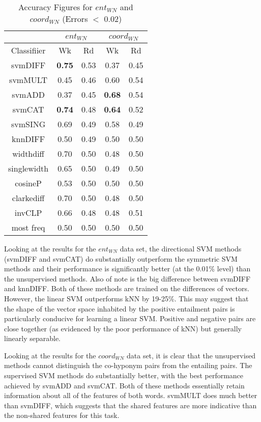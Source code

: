 \documentclass[11pt]{article}
\begin{document}
\begin{table}[ht]
\centering
\begin{tabular}{|c|c|c|c|c|}
\hline
&\multicolumn{2}{|c|}{$ent_{WN}$}&\multicolumn{2}{|c|}{$coord_{WN}$}\\
\hline
Classifiier&Wk&Rd&Wk&Rd\\
\hline
svmDIFF&\textbf{0.75}&0.53&0.37&0.45\\
svmMULT&0.45&0.46&0.60&0.54\\
svmADD&0.37&0.45&\textbf{0.68}&0.54\\
svmCAT&\textbf{0.74}&0.48&\textbf{0.64}&0.52\\
svmSING&0.69&0.49&0.58&0.49\\
knnDIFF&0.50&0.49&0.50&0.50\\
\hline
widthdiff&0.70&0.50&0.48&0.50\\
singlewidth&0.65&0.50&0.49&0.50\\
cosineP&0.53&0.50&0.50&0.50\\
clarkediff&0.70&0.50&0.48&0.50\\
invCLP&0.66&0.48&0.48&0.51\\
most freq&0.50&0.50&0.50&0.50\\
\hline
\end{tabular}
\caption{Accuracy Figures for $ent_{WN}$ and $coord_{WN}$ (Errors $<$ 0.02)}
\label{table:results_WN}
\end{table}

Looking at the results for the $ent_{WN}$ data set, the directional SVM methods (svmDIFF and svmCAT) do substantially outperform the symmetric SVM methods and their performance is significantly better (at the 0.01\% level) than the unsupervised methods.  Also of note is the big difference between svmDIFF and knnDIFF.  Both of these methods are trained on the differences of vectors.  However, the linear SVM outperforms kNN by 19-25\%.  This may suggest that the shape of the vector space inhabited by the positive entailment pairs is particularly conducive for learning a linear SVM.  Positive and negative pairs are close together (as evidenced by the poor performance of kNN) but generally linearly separable.

Looking at the results for the $coord_{WN}$ data set, it is clear that the unsupervised methods cannot distinguish the co-hyponym pairs from the entailing pairs.  The supervised SVM methods do substantially better, with the best performance achieved by svmADD and svmCAT.  Both of these methods essentially retain information about all of the features of both words.  svmMULT does much better than svmDIFF, which suggests that the shared features are more indicative than the non-shared features for this task. 
\end{document}
